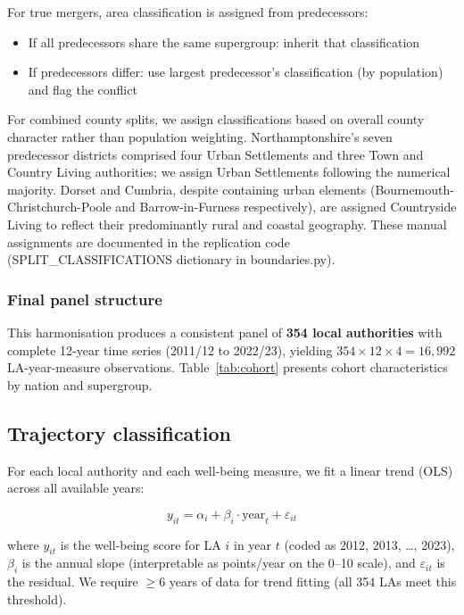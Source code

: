 \documentclass[12pt,a4paper]{article}
\begin{document}
For true mergers, area classification is assigned from predecessors:
\begin{itemize}
\item If all predecessors share the same supergroup: inherit that classification
\item If predecessors differ: use largest predecessor's classification (by population) and flag the conflict
\end{itemize}

For combined county splits, we assign classifications based on overall county character rather than population weighting. Northamptonshire's seven predecessor districts comprised four Urban Settlements and three Town and Country Living authorities; we assign Urban Settlements following the numerical majority. Dorset and Cumbria, despite containing urban elements (Bournemouth-Christchurch-Poole and Barrow-in-Furness respectively), are assigned Countryside Living to reflect their predominantly rural and coastal geography. These manual assignments are documented in the replication code (SPLIT\_CLASSIFICATIONS dictionary in boundaries.py).

\subsubsection{Final panel structure}

This harmonisation produces a consistent panel of \textbf{354 local authorities} with complete 12-year time series (2011/12 to 2022/23), yielding $354 \times 12 \times 4 = 16{,}992$ LA-year-measure observations. Table~\ref{tab:cohort} presents cohort characteristics by nation and supergroup.

\subsection{Trajectory classification}

For each local authority and each well-being measure, we fit a linear trend (OLS) across all available years:

\[
y_{it} = \alpha_i + \beta_i \cdot \text{year}_t + \varepsilon_{it}
\]

where $y_{it}$ is the well-being score for LA $i$ in year $t$ (coded as 2012, 2013, \ldots, 2023), $\beta_i$ is the annual slope (interpretable as points/year on the 0--10 scale), and $\varepsilon_{it}$ is the residual. We require $\geq 6$ years of data for trend fitting (all 354 LAs meet this threshold).
\end{document}
